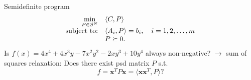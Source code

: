 \begin{frame}{Semidefinite program}
      \begin{equation*}
        \label{eq:sdp_standard}
        \begin{array}{rl}
          \min\limits_{P \in \SymK[N]} & \la C, P \ra\\
          \text{subject to:} & \la A_i, P \ra = b_i, \quad i=1,2,\ldots,m\\
          & P \succeq 0.
        \end{array}
      \end{equation*}
      \pause
      Is $f(x) = 4x^4 + 4x^3y - 7x^2y^2 - 2xy^3 + 10y^4$ always non-negative? $\to$ sum of squares relaxation: Does there exist psd matrix $P$ s.t.
      \[f = \mathbf{x}^T P \mathbf{x} = \langle \mathbf{x} \mathbf{x}^T, P \rangle ?\]
      

\end{frame}

